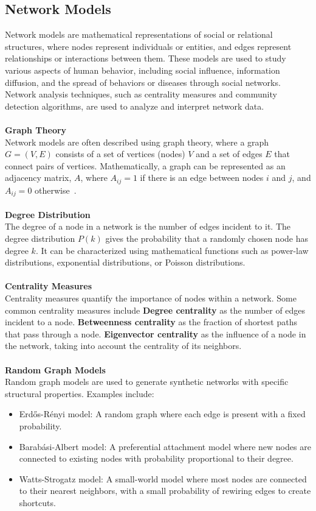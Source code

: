 \documentclass[12pt]{article}
\begin{document}
\subsection{Network Models}\label{nm}
Network models are mathematical representations of social or relational
structures, where nodes represent individuals or entities, and edges
represent relationships or interactions between them. These models are
used to study various aspects of human behavior, including social influence,
information diffusion, and the spread of behaviors or diseases through
social networks. Network analysis techniques, such as centrality measures
and community detection algorithms, are used to analyze and interpret network data.\\
\\
\textbf{Graph Theory}\\
Network models are often described using graph theory,
where a graph \( G = (V, E) \) consists of a set of
vertices (nodes) \( V \) and a set of edges \( E \) that connect pairs
of vertices. Mathematically, a graph can be represented as an adjacency
matrix, \( A \), where \( A_{ij} = 1 \) if there is an edge between
nodes \( i \) and \( j \), and \( A_{ij} = 0 \) otherwise~\cite{bondy2008graph, WOS:000988346000001}.\\
\\
\textbf{Degree Distribution}\\
The degree of a node in a network is the number of edges incident to it.
The degree distribution \( P(k) \) gives the probability that a randomly chosen node
has degree \( k \). It can be characterized using mathematical functions such as power-law
distributions, exponential distributions, or Poisson distributions.\\
\\
\textbf{Centrality Measures}\\
Centrality measures quantify the importance of nodes within a network.
Some common centrality measures include \textbf{Degree centrality} as the number of edges
incident to a node. \textbf{Betweenness centrality} as the fraction of shortest paths that
pass through a node. \textbf{Eigenvector centrality} as the influence of a node in the network,
taking into account the centrality of its neighbors.\\
\\
\textbf{Random Graph Models}\\
Random graph models are used to generate synthetic networks with specific structural
properties. Examples include:\\
\begin{itemize}
   \item Erdős-Rényi model: A random graph where each edge is present with a fixed probability.
   \item Barabási-Albert model: A preferential attachment model where new nodes are connected to existing nodes with probability proportional to their degree.
   \item Watts-Strogatz model: A small-world model where most nodes are connected to their nearest neighbors, with a small probability of rewiring edges to create shortcuts.
\end{itemize}
\end{document}
